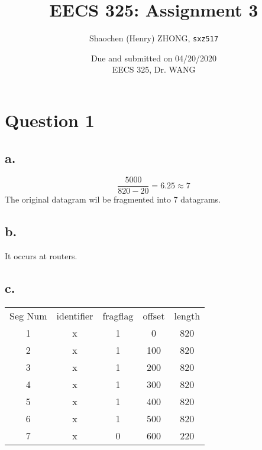 \documentclass[12pt]{article}
\newcommand{\ilc}{\texttt}
\begin{document}
\title{\textbf{EECS 325: Assignment 3}}

\author{Shaochen (Henry) ZHONG, \ilc{sxz517} }
\date{Due and submitted on 04/20/2020 \\ EECS 325, Dr. WANG}
\maketitle

\section{Question 1}

\subsection{a.}

\begin{equation*}
    \frac{5000}{820 - 20} = 6.25 \approx 7
\end{equation*}
The original datagram wil be fragmented into 7 datagrams.

\subsection{b.}

It occurs at routers.

\subsection{c.}

\begin{table}[H]
\center
\begin{tabular}{ccccc}
\cline{1-1}
\multicolumn{1}{|c|}{Seg Num} & identifier & fragflag & offset & length \\ \cline{1-1}
1                                & x        & 1        & 0      & 820    \\
2                                & x        & 1        & 100    & 820    \\
3                                & x        & 1        & 200    & 820    \\
4                                & x        & 1        & 300    & 820    \\
5                                & x        & 1        & 400    & 820    \\
6                                & x        & 1        & 500    & 820    \\
7                                & x        & 0        & 600    & 220
\end{tabular}
\end{table}
\end{document}
